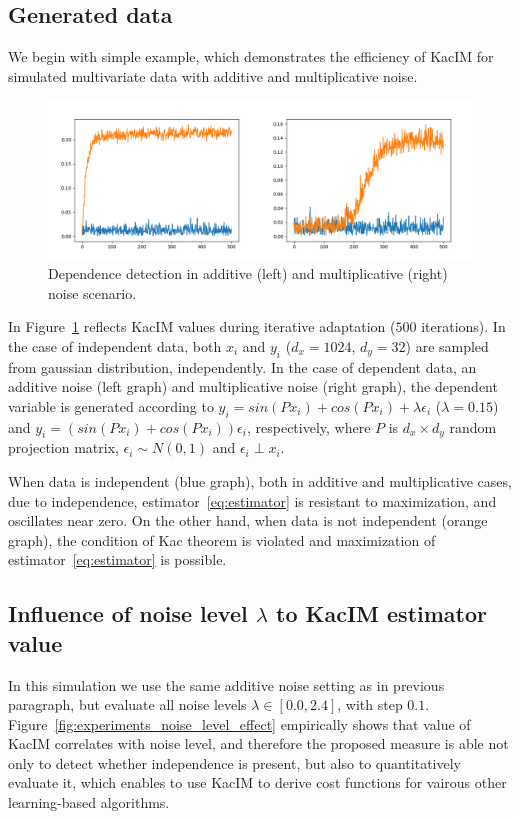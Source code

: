 \documentclass{article}
\begin{document}
\subsection{Generated data}

We begin with simple example, which demonstrates the efficiency of KacIM for simulated multivariate data with additive and multiplicative noise.

\begin{figure}[t]
\label{fig:experiments_simulation}
\centering
\includegraphics[scale=0.25]{./out.png}
\caption{Dependence detection in additive (left) and multiplicative (right) noise scenario.}
\end{figure}

In Figure~\ref{fig:experiments_simulation} reflects KacIM values during iterative adaptation ($500$ iterations). In the case of independent data, both $x_{i}$ and $y_{i}$ ($d_{x} = 1024$, $d_{y} = 32$) are sampled from gaussian distribution, independently. In the case of dependent data, an additive noise (left graph) and multiplicative noise (right graph), the dependent variable is generated according to $y_{i} = sin(P x_{i}) + cos(P x_{i}) + \lambda \epsilon_{i}$ ($\lambda = 0.15$) and $y_{i} = (sin(P x_{i}) + cos(P x_{i})) \epsilon_{i}$, respectively, where $P$ is $d_{x} \times d_{y}$ random projection matrix, $\epsilon_{i} \sim N(0,1)$ and $\epsilon_{i} \perp x_{i}$.

When data is independent (blue graph), both in additive and multiplicative cases, due to independence, estimator~\eqref{eq:estimator} is resistant to maximization, and oscillates near zero. On the other hand, when data is not independent (orange graph), the condition of Kac theorem is violated and maximization of estimator~\eqref{eq:estimator} is possible.

\subsection{Influence of noise level $\lambda$ to KacIM estimator value}
In this simulation we use the same additive noise setting as in previous paragraph, but evaluate all noise levels $\lambda \in [0.0, 2.4]$, with step $0.1$.
Figure~\ref{fig:experiments_noise_level_effect} empirically shows that value of KacIM correlates with noise level, and therefore the proposed measure is able not only to detect whether independence is present, but also to quantitatively evaluate it, which enables to use KacIM to derive cost functions for vairous other learning-based algorithms. %
\end{document}
